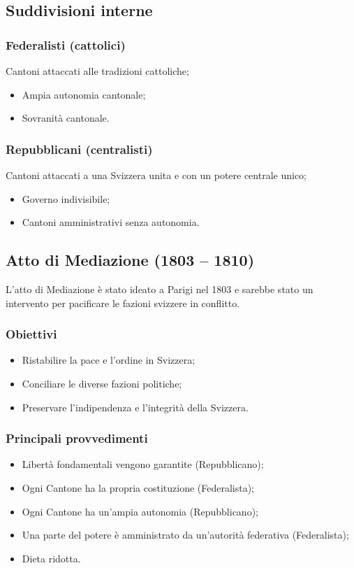 \documentclass{article}
\begin{document}
\subsection{Suddivisioni interne}

\subsubsection{Federalisti (cattolici)}
Cantoni attaccati alle tradizioni cattoliche;
\begin{itemize}
    \item Ampia autonomia cantonale;
    \item Sovranità cantonale.
\end{itemize}

\subsubsection{Repubblicani (centralisti)}
Cantoni attaccati a una Svizzera unita e con un potere centrale unico;
\begin{itemize}
    \item Governo indivisibile;
    \item Cantoni amministrativi senza autonomia.
\end{itemize}

\subsection{Atto di Mediazione (1803 – 1810)}
L’atto di Mediazione è stato ideato a Parigi nel 1803 e sarebbe stato un intervento per
pacificare le fazioni svizzere in conflitto.

\subsubsection{Obiettivi}
\begin{itemize}
    \item Ristabilire la pace e l’ordine in Svizzera;
    \item Conciliare le diverse fazioni politiche;
    \item Preservare l’indipendenza e l’integrità della Svizzera.
\end{itemize}

\subsubsection{Principali provvedimenti}
\begin{itemize}
    \item Libertà fondamentali vengono garantite (Repubblicano);
    \item Ogni Cantone ha la propria costituzione (Federalista);
    \item Ogni Cantone ha un’ampia autonomia (Repubblicano);
    \item Una parte del potere è amministrato da un’autorità federativa (Federalista);
    \item Dieta ridotta.
\end{itemize}
\end{document}
